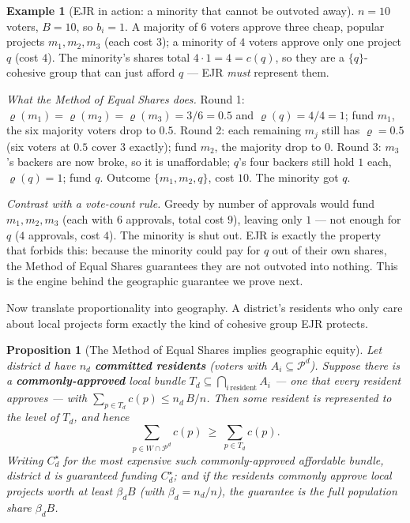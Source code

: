 \documentclass[11pt,letterpaper]{article}
\theoremstyle{definition}
\newtheorem{example}{Example}[section]
\theoremstyle{plain}
\newtheorem{proposition}{Proposition}[section]
\theoremstyle{remark}
\newcommand{\Pset}{\mathcal{P}}
\newcommand{\budget}{B}
\newcommand{\cost}{c}
\newcommand{\mesrho}{\varrho}      %
\begin{document}
\begin{example}[EJR in action: a minority that cannot be outvoted away]
\label{ex:ejr}
$n=10$ voters, $\budget=10$, so $b_i=1$. A majority of $6$ voters approve three cheap, popular
projects $m_1,m_2,m_3$ (each cost $3$); a minority of $4$ voters approve only one project $q$
(cost $4$). The minority's shares total $4\cdot1=4=\cost(q)$, so they are a $\{q\}$-cohesive group
that can just afford $q$ --- EJR \emph{must} represent them.

\emph{What the Method of Equal Shares does.} Round 1:
$\mesrho(m_1)=\mesrho(m_2)=\mesrho(m_3)=3/6=0.5$ and $\mesrho(q)=4/4=1$; fund $m_1$, the six majority
voters drop to $0.5$. Round 2: each remaining $m_j$ still has $\mesrho=0.5$ (six voters at $0.5$ cover
$3$ exactly); fund $m_2$, the majority drop to $0$. Round 3: $m_3$'s backers are now broke, so it is
unaffordable; $q$'s four backers still hold $1$ each, $\mesrho(q)=1$; fund $q$. Outcome
$\{m_1,m_2,q\}$, cost $10$. The minority got $q$.

\emph{Contrast with a vote-count rule.} Greedy by number of approvals would fund $m_1,m_2,m_3$ (each
with $6$ approvals, total cost $9$), leaving only $1$ --- not enough for $q$ ($4$ approvals, cost $4$).
The minority is shut out. EJR is exactly the property that forbids this: because the minority could
pay for $q$ out of their own shares, the Method of Equal Shares guarantees they are not outvoted into
nothing. This is the engine behind the geographic guarantee we prove next.
\end{example}

\noindent Now translate proportionality into geography. A district's residents who only care about
local projects form exactly the kind of cohesive group EJR protects.

\begin{proposition}[The Method of Equal Shares implies geographic equity]
\label{prop:mesq}
Let district $d$ have $n_d$ \textbf{committed residents} (voters with $A_i\subseteq\Pset^d$).
Suppose there is a \textbf{commonly-approved} local bundle
$T_d\subseteq\bigcap_{i\,\text{resident}}A_i$ --- one that \emph{every} resident approves --- with
$\sum_{p\in T_d}\cost(p)\le n_d\,\budget/n$. Then some resident is represented to the level of
$T_d$, and hence
\[
  \sum_{p\in W\cap\Pset^d}\cost(p)\ \ge\ \sum_{p\in T_d}\cost(p).
\]
Writing $C_d^\star$ for the most expensive such commonly-approved affordable bundle, district $d$ is
guaranteed funding $C_d^\star$; and if the residents commonly approve local projects worth at least
$\beta_d\budget$ (with $\beta_d=n_d/n$), the guarantee is the full population share $\beta_d\budget$.
\end{proposition}
\end{document}
